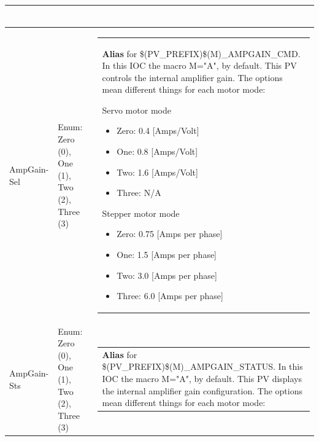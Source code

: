 \documentclass[openany]{article}
\begin{document}
\begin{longtable}{| m{4.5cm} m{2.5cm}  m{8.5cm} |}
\begin{tabular}{@{}m{6cm}@{}}
            \end{tabular} \hypertarget{pv:amp-gain}{}\\ \hline
        AmpGain-Sel & Enum: Zero (0), One (1), Two (2), Three (3) & \begin{tabular}{@{}m{6cm}@{}}
                \textbf{\color{blue} Alias} for \$(PV\_PREFIX)\$(M)\_AMPGAIN\_CMD. In this IOC the macro M="A", by default. This PV controls the internal amplifier gain. The options mean different things for each motor mode:

                Servo motor mode
                \begin{itemize}
                    \item Zero: 0.4 [Amps/Volt]
                    \item One: 0.8 [Amps/Volt]
                    \item Two: 1.6 [Amps/Volt]
                    \item Three: N/A
                \end{itemize}
                Stepper motor mode
                \begin{itemize}
                    \item Zero: 0.75 [Amps per phase]
                    \item One: 1.5 [Amps per phase]
                    \item Two: 3.0 [Amps per phase]
                    \item Three: 6.0 [Amps per phase]
                \end{itemize}
            \end{tabular} \hypertarget{}{}\\ \hline
        AmpGain-Sts & Enum: Zero (0), One (1), Two (2), Three (3) & \begin{tabular}{@{}m{6cm}@{}}
                \textbf{\color{blue} Alias} for \$(PV\_PREFIX)\$(M)\_AMPGAIN\_STATUS. In this IOC the macro M="A", by default. This PV displays the internal amplifier gain configuration. The options mean different things for each motor mode:


\end{tabular}
\end{longtable}
\end{document}

